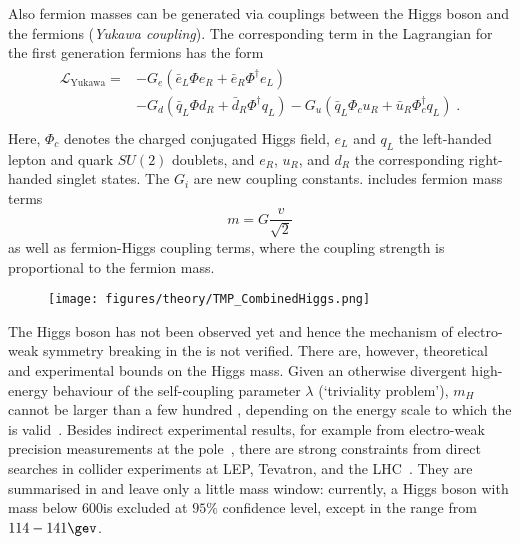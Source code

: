 Also fermion masses can be generated via couplings between the Higgs boson and the fermions (\emph{Yukawa coupling}).
The corresponding term in the Lagrangian for the first generation fermions has the form
\begin{align}
  \begin{split}\label{eq:Theory:SM:EWSB:YukawaLagrangian}
    \mathcal{L}_{\text{Yukawa}} = & -G_{e}\left(\bar{e}_{L}\Phi e_{R} + \bar{e}_{R}\Phi^{\dagger}e_{L}\right) \\
     & -G_{d}\left(\bar{q}_{L}\Phi d_{R} + \bar{d}_{R}\Phi^{\dagger}q_{L}\right)
      -G_{u}\left(\bar{q}_{L}\Phi_{c} u_{R} + \bar{u}_{R}\Phi^{\dagger}_{c}q_{L}\right) \;. \\
  \end{split}
\end{align}
Here, $\Phi_{c}$ denotes the charged conjugated Higgs field, $e_{L}$ and $q_{L}$ the left-handed lepton and quark $SU(2)$ doublets, and $e_{R}$, $u_{R}$, and $d_{R}$ the corresponding right-handed singlet states.
The $G_{i}$ are new coupling constants.
 includes fermion mass terms
\begin{equation}\label{eq:Theory:SM:EWSB:YukawaMassTerm}
  m = G\frac{v}{\sqrt{2}}
\end{equation}
as well as fermion-Higgs coupling terms, where the coupling strength is proportional to the fermion mass.

\begin{figure}[ht]
  \centering
  \texttt{[image: figures/theory/TMP\_CombinedHiggs.png]}\\
  \caption{\cite{} }
  \label{fig:Theory:SM:EWSB:HiggsLimit}
\end{figure}
The Higgs boson has not been observed yet and hence the mechanism of electro-weak symmetry breaking in the \sm is not verified.
There are, however, theoretical and experimental bounds on the Higgs mass.
Given an otherwise divergent high-energy behaviour of the self-coupling parameter $\lambda$ (`triviality problem'), $m_{H}$ cannot be larger than a few hundred \gevnospace, depending on the energy scale to which the \sm is valid~\cite{bib:Hambye:1996wb}.
Besides indirect experimental results, for example from electro-weak precision measurements at the \Z pole~\cite{bib:LEPEWKWG:ZPolse2005}, there are strong constraints from direct searches in collider experiments at LEP, Tevatron, and the LHC~\cite{bib:Barate:2003sz,bib:TevatronHiggs:2011cb,bib:ATLASCMS:HiggsLimit}.
They are summarised in  and leave only a little mass window: currently, a \sm Higgs boson with mass below 600\gev is excluded at $95\%$ confidence level, except in the range from \mbox{$114-141\gev$}.

